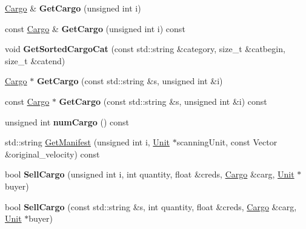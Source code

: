 \begin{DoxyCompactItemize}
\item 
\hyperlink{classCargo}{Cargo} \& {\bfseries Get\+Cargo} (unsigned int i)\hypertarget{classUnit_a0d6289231e5e8fa2dad268f27632a997}{}\label{classUnit_a0d6289231e5e8fa2dad268f27632a997}

\item 
const \hyperlink{classCargo}{Cargo} \& {\bfseries Get\+Cargo} (unsigned int i) const \hypertarget{classUnit_ac2df17f3f05e9c00ebb64decb072a916}{}\label{classUnit_ac2df17f3f05e9c00ebb64decb072a916}

\item 
void {\bfseries Get\+Sorted\+Cargo\+Cat} (const std\+::string \&category, size\+\_\+t \&catbegin, size\+\_\+t \&catend)\hypertarget{classUnit_a111bdccc6aa295c95fad4f81de868657}{}\label{classUnit_a111bdccc6aa295c95fad4f81de868657}

\item 
\hyperlink{classCargo}{Cargo} $\ast$ {\bfseries Get\+Cargo} (const std\+::string \&s, unsigned int \&i)\hypertarget{classUnit_ab151cda72613f69f33aaef39cb78d08c}{}\label{classUnit_ab151cda72613f69f33aaef39cb78d08c}

\item 
const \hyperlink{classCargo}{Cargo} $\ast$ {\bfseries Get\+Cargo} (const std\+::string \&s, unsigned int \&i) const \hypertarget{classUnit_a160150b628414e7ca48bc0aac441403a}{}\label{classUnit_a160150b628414e7ca48bc0aac441403a}

\item 
unsigned int {\bfseries num\+Cargo} () const \hypertarget{classUnit_a92dd143b11b1784de3442a037c2d22f3}{}\label{classUnit_a92dd143b11b1784de3442a037c2d22f3}

\item 
std\+::string \hyperlink{classUnit_a0a0dbb25c02ab3e89fe8f0c818a26513}{Get\+Manifest} (unsigned int i, \hyperlink{classUnit}{Unit} $\ast$scanning\+Unit, const Vector \&original\+\_\+velocity) const 
\item 
bool {\bfseries Sell\+Cargo} (unsigned int i, int quantity, float \&creds, \hyperlink{classCargo}{Cargo} \&carg, \hyperlink{classUnit}{Unit} $\ast$buyer)\hypertarget{classUnit_aad68e14a7bbca99ced66c612e48e11e6}{}\label{classUnit_aad68e14a7bbca99ced66c612e48e11e6}

\item 
bool {\bfseries Sell\+Cargo} (const std\+::string \&s, int quantity, float \&creds, \hyperlink{classCargo}{Cargo} \&carg, \hyperlink{classUnit}{Unit} $\ast$buyer)\hypertarget{classUnit_aec236f237f964217212ad30af674d7b9}{}\label{classUnit_aec236f237f964217212ad30af674d7b9}


\end{DoxyCompactItemize}

